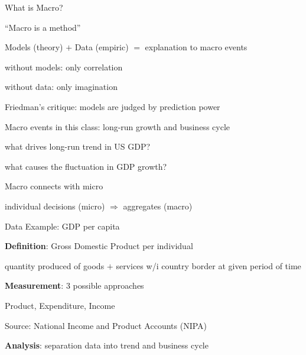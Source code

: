 \documentclass[11pt,aspectratio=169,usenames,dvipsnames]{beamer}
\let\tempone\itemize
\let\temptwo\enditemize
\renewenvironment{itemize}{\tempone\addtolength{\itemsep}{\fill}}{\temptwo}
\begin{document}
\begin{frame}{What is Macro?}
\label{slide:What_is_Macro_}
    \begin{itemize}
        \item ``\alert{Macro is a method}''
        \item Models (theory) $ + $ Data (empiric) $ = $ explanation to macro events
        \begin{itemize}
            \item without models: only \alert{correlation}
            \item without data: only \alert{imagination}
            \item \alert{Friedman's critique}: models are judged by \alert{prediction power}
        \end{itemize}
        \item Macro events in this class: \alert{long-run growth} and \alert{business cycle}
        \begin{itemize}
            \item what drives long-run trend in US GDP?
            \item what causes the fluctuation in GDP growth?
        \end{itemize}
        \item Macro connects with micro
        \begin{itemize}
            \item individual decisions (micro) $ \Rightarrow  $ aggregates (macro)
        \end{itemize}
    \end{itemize}
\end{frame}

\begin{frame}{Data Example: GDP per capita}
\label{slide:Data_Example__GDP}
    \begin{itemize}
        \item \textbf{Definition}: Gross Domestic Product \alert{per individual}
        \begin{itemize}
            \item quantity produced of \alert{goods $ + $ services} w/i country \alert{border} at given \alert{period of time}
        \end{itemize}
        \item \textbf{Measurement}: $ 3 $ possible approaches
        \begin{itemize}
            \item Product, Expenditure, Income
            \item Source: National Income and Product Accounts (NIPA)
        \end{itemize}
        \item \textbf{Analysis}: separation data into \alert{trend} and \alert{business cycle}
    \end{itemize}
\end{frame}
\end{document}
